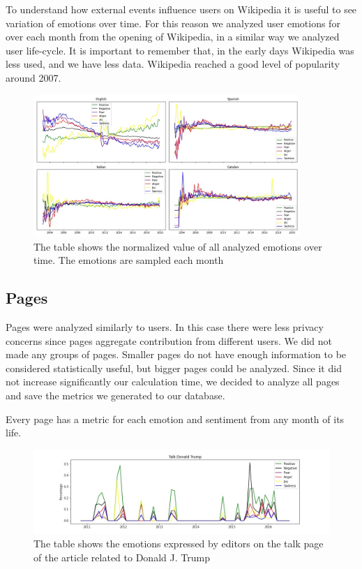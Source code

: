 To understand how external events influence users on Wikipedia it is useful to see variation of emotions over time. For this reason we analyzed user emotions for over each month from the opening of Wikipedia, in a similar way we analyzed user life-cycle. It is important to remember that, in the early days Wikipedia was less used, and we have less data. Wikipedia reached a good level of popularity around 2007.

\begin{figure}[H]
    \centering
    \includegraphics[width=0.9\textwidth]{./img/time.jpg}
    \caption{ The table shows the normalized value of all analyzed emotions over time. The emotions are sampled each month }
    \label{fig:time}
\end{figure}

\subsection{Pages}
\label{sec:respages}
Pages were analyzed similarly to users. In this case there were less privacy concerns since pages aggregate contribution from different users. We did not made any groups of pages. Smaller pages do not have enough information to be considered statistically useful, but bigger pages could be analyzed. Since it did not increase significantly our calculation time, we decided to analyze all pages and save the metrics we generated to our database.

Every page has a metric for each emotion and sentiment from any month of its life.

\begin{figure}[H]
    \centering
    \includegraphics[width=1\textwidth]{./img/trump.jpg}
    \caption{ The table shows the emotions expressed by editors on the talk page of the article related to Donald J. Trump }
    \label{fig:trump}
\end{figure}
